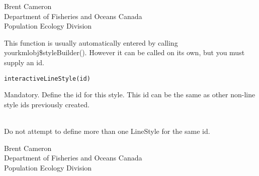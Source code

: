 \documentclass[a4paper]{book}
\begin{document}
%
\begin{Author}\relax
Brent Cameron\\{}
Department of Fisheries and Oceans Canada\\{}
Population Ecology Division
\end{Author}
%
\begin{Examples}
\end{Examples}
%
\begin{Description}\relax
This function is usually automatically entered by calling yourkmlobj\$styleBuilder(). However it can be called on its own, but you must supply an id.
\end{Description}
%
\begin{Usage}
\begin{verbatim}
interactiveLineStyle(id)
\end{verbatim}
\end{Usage}
%
\begin{Arguments}
\begin{ldescription}
\item[\code{id}] 
Mandatory. Define the id for this style. This id can be the same as other non-line style ids previously created.

\end{ldescription}
\end{Arguments}
%
\begin{Note}\relax
{}\\{}
Do not attempt to define more than one LineStyle for the same id.

\end{Note}
%
\begin{Author}\relax
Brent Cameron\\{}
Department of Fisheries and Oceans Canada\\{}
Population Ecology Division
\end{Author}
\end{document}
